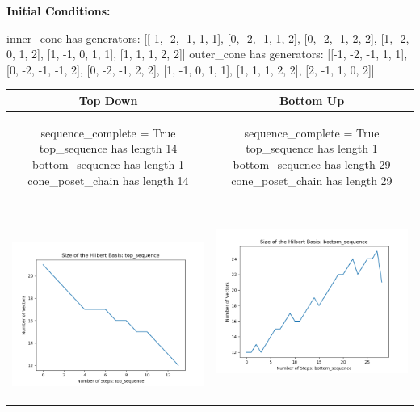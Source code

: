 \documentclass[10pt]{article}
\begin{document}
\textbf{Initial Conditions:}
\begin{SAGE}
inner_cone has generators: 
[[-1, -2, -1, 1, 1], [0, -2, -1, 1, 2], [0, -2, -1, 2, 2], [1, -2, 0, 1, 2], [1, -1, 0, 1, 1], [1, 1, 1, 2, 2]]
outer_cone has generators: 
[[-1, -2, -1, 1, 1], [0, -2, -1, -1, 2], [0, -2, -1, 2, 2], [1, -1, 0, 1, 1], [1, 1, 1, 2, 2], [2, -1, 1, 0, 2]]

\end{SAGE}
\begin{tabular}{c|c}
\textbf{Top Down} & \textbf{Bottom Up} \\ \hline  
\begin{SAGE}
	sequence_complete = True
	top_sequence has length 14
	bottom_sequence has length 1
	cone_poset_chain has length 14
\end{SAGE} 
&
\begin{SAGE}
	sequence_complete = True
	top_sequence has length 1
	bottom_sequence has length 29
	cone_poset_chain has length 29
\end{SAGE} 
\\ \hline
\
\begin{minipage}{.45\textwidth}
\includegraphics[width=\textwidth]{"DATA/5d/6 generators 2 bound D/top_sequence SIZE"}
\end{minipage} &
\begin{minipage}{.45\textwidth}
\includegraphics[width=\textwidth]{"DATA/5d/6 generators 2 bound D bottomup/bottom_sequence SIZE"}

\end{minipage}
\end{tabular}
\end{document}
